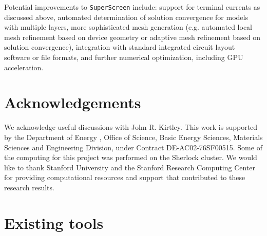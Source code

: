 \documentclass[final,3p,times,twocolumn]{elsarticle}
\newcommand{\inline}[1]{\texttt{#1}\xspace}
\newcommand{\SuperScreen}{\inline{SuperScreen}}
\begin{document}
Potential improvements to \SuperScreen include: support for terminal currents as discussed above, automated determination of solution convergence for models with multiple layers, more sophisticated mesh generation (e.g. automated local mesh refinement based on device geometry or adaptive mesh refinement based on solution convergence), integration with standard integrated circuit layout software or file formats, and further numerical optimization, including GPU acceleration.

\section{Acknowledgements}
\label{section:acknowledgements}
We acknowledge useful discussions with John R. Kirtley. This work is supported by the Department of Energy
,  Office of Science, Basic Energy Sciences, Materials Sciences and Engineering Division, under Contract DE-AC02-76SF00515. Some of the computing for this project was performed on the Sherlock cluster. We would like to thank Stanford University and the Stanford Research Computing Center for providing computational resources and support that contributed to these research results.




\appendix

\section{Existing tools}
\label{appendix:other-tools}
\end{document}
